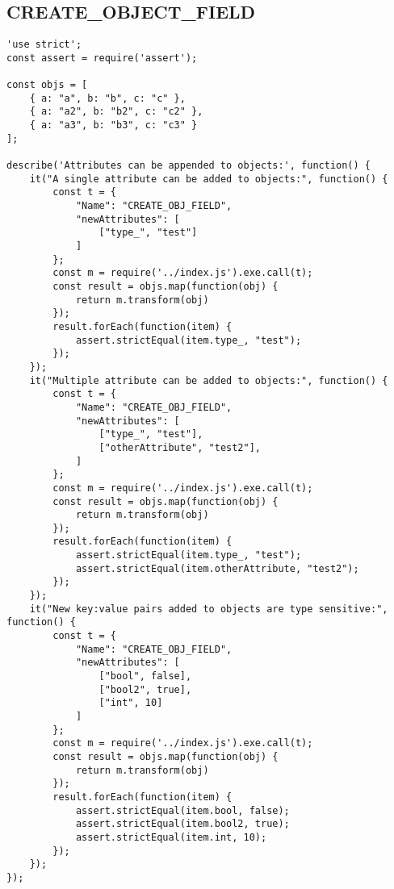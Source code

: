 \subsection{CREATE\_OBJECT\_FIELD}
\label{CREATE_OBJECT_FIELD-tests}
\begin{verbatim}
'use strict';
const assert = require('assert');

const objs = [
    { a: "a", b: "b", c: "c" },
    { a: "a2", b: "b2", c: "c2" },
    { a: "a3", b: "b3", c: "c3" }
];

describe('Attributes can be appended to objects:', function() {
    it("A single attribute can be added to objects:", function() {
        const t = {
            "Name": "CREATE_OBJ_FIELD",
            "newAttributes": [
                ["type_", "test"]
            ]
        };
        const m = require('../index.js').exe.call(t);
        const result = objs.map(function(obj) {
            return m.transform(obj)
        });
        result.forEach(function(item) {
            assert.strictEqual(item.type_, "test");
        });
    });
    it("Multiple attribute can be added to objects:", function() {
        const t = {
            "Name": "CREATE_OBJ_FIELD",
            "newAttributes": [
                ["type_", "test"],
                ["otherAttribute", "test2"],
            ]
        };
        const m = require('../index.js').exe.call(t);
        const result = objs.map(function(obj) {
            return m.transform(obj)
        });
        result.forEach(function(item) {
            assert.strictEqual(item.type_, "test");
            assert.strictEqual(item.otherAttribute, "test2");
        });
    });
    it("New key:value pairs added to objects are type sensitive:", function() {
        const t = {
            "Name": "CREATE_OBJ_FIELD",
            "newAttributes": [
                ["bool", false],
                ["bool2", true],
                ["int", 10]
            ]
        };
        const m = require('../index.js').exe.call(t);
        const result = objs.map(function(obj) {
            return m.transform(obj)
        });
        result.forEach(function(item) {
            assert.strictEqual(item.bool, false);
            assert.strictEqual(item.bool2, true);
            assert.strictEqual(item.int, 10);
        });
    });
});
\end{verbatim}

